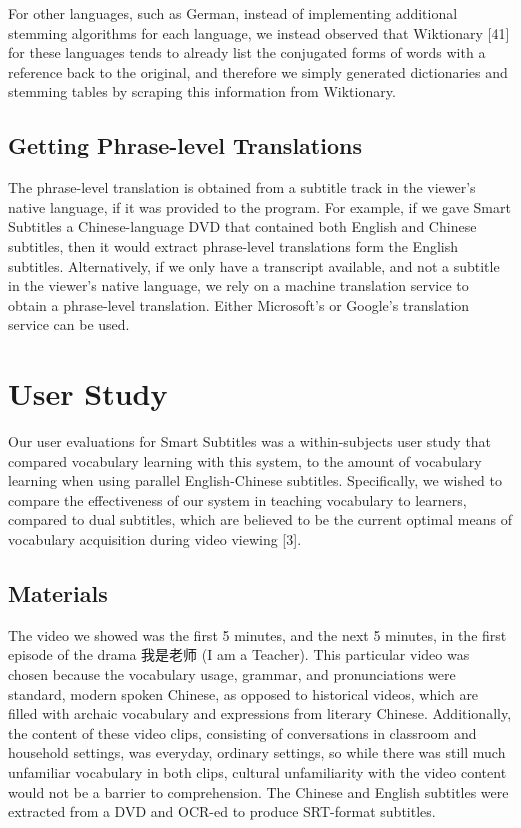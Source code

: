 \documentclass{sigchi}
\begin{document}
For other languages, such as German, instead of implementing additional stemming algorithms for each language, we instead observed that Wiktionary [41] for these languages tends to already list the conjugated forms of words with a reference back to the original, and therefore we simply generated dictionaries and stemming tables by scraping this information from Wiktionary.

\subsection{Getting Phrase-level Translations}

The phrase-level translation is obtained from a subtitle track in the viewer's native language, if it was provided to 
the program. For example, if we gave Smart Subtitles a Chinese-language DVD
that contained both English and Chinese subtitles, then it would
extract phrase-level translations form the English subtitles.
Alternatively, if we only have a transcript available, and not a subtitle in the viewer's native language, we rely on a machine translation service to obtain a phrase-level translation. Either Microsoft's or Google's translation service can be used.

\section{User Study}

Our user evaluations for Smart Subtitles was a within-subjects user study that compared vocabulary learning with this system, to the amount of vocabulary learning when using parallel English-Chinese subtitles. Specifically, we wished to compare the effectiveness of our system in teaching vocabulary to learners, compared to dual subtitles, which are believed to be the current optimal means of vocabulary acquisition during video viewing [3].

\subsection{Materials}

The video we showed was the first 5 minutes, and the next 5 minutes, in the first episode of the drama 我是老师 (I am a Teacher). This particular video was chosen because the vocabulary usage, grammar, and pronunciations were standard, modern spoken Chinese, as opposed to historical videos, which are filled with archaic vocabulary and expressions from literary Chinese. Additionally, the content of these video clips, consisting of conversations in classroom and household settings, was everyday, ordinary settings, so while there was still much unfamiliar vocabulary in both clips, cultural unfamiliarity with the video content would not be a barrier to comprehension. The Chinese and English subtitles were extracted from a DVD and OCR-ed to produce SRT-format subtitles.
\end{document}
